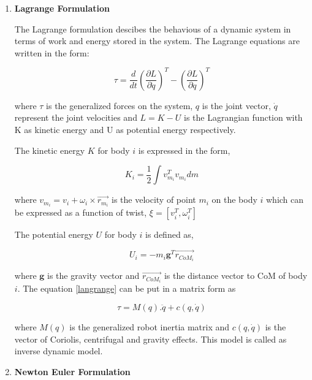 \begin{enumerate}
    \item \textbf{Lagrange Formulation}
    
    The Lagrange formulation descibes the behavious of a dynamic system in terms of work and energy stored in the system. The Lagrange equations are written in the form:

    \begin{equation}
        \tau = \frac{d}{dt}(\frac{\partial L}{\partial \dot{q}})^T - (\frac{\partial L}{\partial q})^T
        \label{langrange}
    \end{equation}

    where $\tau$ is the generalized forces on the system, $q$ is the joint vector, $\dot{q}$ represent the joint velocities and $L=K - U$ is the Lagrangian
    function with K as kinetic energy and U as potential energy respectively.

    The kinetic energy $K$ for body $i$ is expressed in the form,

    \begin{equation}
        K_i = \frac{1}{2} \int v^T_{m_i}v_{m_i}dm 
        \label{kinetic-energy}
    \end{equation}

    where $v_{m_i} = v_i + \omega_i \times \vec{r_{m_i}}$ is the velocity of point $m_i$ on the body $i$ which can be expressed as a function of twist, $\xi = [v_i^T, \omega_i^T]$

    The potential energy $U$ for body $i$ is defined as,

    \begin{equation}
        U_i = -m_i\mathbf{g}^T\vec{r_{CoM_i}}
    \end{equation}
    
    where $\mathbf{g}$ is the gravity vector and $\vec{r_{CoM_i}}$ is the distance vector to CoM of body $i$. The equation \ref{langrange} can be put in a matrix form as 

    \begin{equation}
        \tau = M(q).\ddot{q} + c(q, \dot{q})
        \label{eq: inverse-dynamic-model}
    \end{equation}

    where $M(q)$ is the generalized robot inertia matrix and $c(q, \dot{q})$ is the vector of Coriolis, centrifugal and gravity effects. This model is called as inverse dynamic model.

    \item \textbf{Newton Euler Formulation}
    

\end{enumerate}
